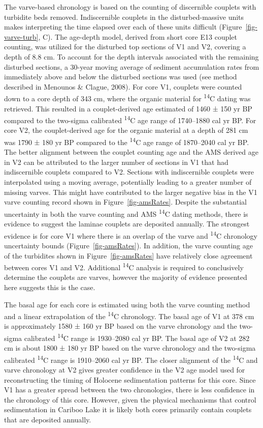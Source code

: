 \documentclass[
  letterpaper,
  DIV=11,
  numbers=noendperiod]{scrartcl}
\begin{document}
The varve-based chronology is based on the counting of discernible
couplets with turbidite beds removed. Indiscernible couplets in the
disturbed-massive units makes interpreting the time elapsed over each of
these units difficult (Figure~\ref{fig-varve-turb}, C). The age-depth
model, derived from short core E13 couplet counting, was utilized for
the disturbed top sections of V1 and V2, covering a depth of 8.8 cm. To
account for the depth intervals associated with the remaining disturbed
sections, a 30-year moving average of sediment accumulation rates from
immediately above and below the disturbed sections was used (see method
described in Menounos \& Clague, 2008). For core V1, couplets were
counted down to a core depth of 343 cm, where the organic material for
\textsuperscript{14}C dating was retrieved. This resulted in a
couplet-derived age estimated of 1460 ± 150 yr BP compared to the
two-sigma calibrated \textsuperscript{14}C age range of 1740--1880 cal
yr BP. For core V2, the couplet-derived age for the organic material at
a depth of 281 cm was 1790 ± 180 yr BP compared to the
\textsuperscript{14}C age range of 1870--2040 cal yr BP. The better
alignment between the couplet counting age and the AMS derived age in V2
can be attributed to the larger number of sections in V1 that had
indiscernible couplets compared to V2. Sections with indiscernible
couplets were interpolated using a moving average, potentially leading
to a greater number of missing varves. This might have contributed to
the larger negative bias in the V1 varve counting record shown in
Figure~\ref{fig-amsRates}. Despite the substantial uncertainty in both
the varve counting and AMS \textsuperscript{14}C dating methods, there
is evidence to suggest the laminae couplets are deposited annually. The
strongest evidence is for core V1 where there is an overlap of the varve
and \textsuperscript{14}C chronology uncertainty bounds
(Figure~\ref{fig-amsRates}). In addition, the varve counting age of the
turbidites shown in Figure~\ref{fig-amsRates} have relatively close
agreement between cores V1 and V2. Additional \textsuperscript{14}C
analysis is required to conclusively determine the couplets are varves,
however the majority of evidence presented here suggests this is the
case.

The basal age for each core is estimated using both the varve counting
method and a linear extrapolation of the \textsuperscript{14}C
chronology. The basal age of V1 at 378 cm is approximately 1580 ± 160 yr
BP based on the varve chronology and the two-sigma calibrated
\textsuperscript{14}C range is 1930--2080 cal yr BP. The basal age of V2
at 282 cm is about 1800 ± 180 yr BP based on the varve chronology and
the two-sigma calibrated \textsuperscript{14}C range is 1910--2060 cal
yr BP. The closer alignment of the \textsuperscript{14}C and varve
chronology at V2 gives greater confidence in the V2 age model used for
reconstructing the timing of Holocene sedimentation patterns for this
core. Since V1 has a greater spread between the two chronologies, there
is less confidence in the chronology of this core. However, given the
physical mechanisms that control sedimentation in Cariboo Lake it is
likely both cores primarily contain couplets that are deposited
annually.
\end{document}
